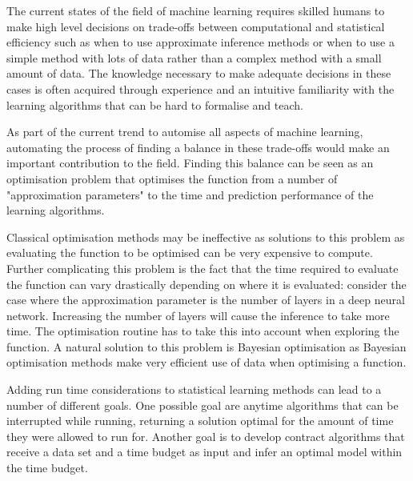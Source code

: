 \documentclass[a4paper,12pt,twoside,openright]{report}
\begin{document}
The current states of the field of machine learning requires skilled humans to make high level decisions on trade-offs between computational and statistical efficiency such as when to use approximate inference methods or when to use a simple method with lots of data rather than a complex method with a small amount of data. The knowledge necessary to make adequate decisions in these cases is often acquired through experience and an intuitive familiarity with the learning algorithms that can be hard to formalise and teach.

As part of the current trend to automise all aspects of machine learning, automating the process of finding a balance in these trade-offs would make an important contribution to the field. Finding this balance can be seen as an optimisation problem that optimises the function from a number of "approximation parameters" to the time and prediction performance of the learning algorithms. 

Classical optimisation methods may be ineffective as solutions to this problem as evaluating the function to be optimised can be very expensive to compute. Further complicating this problem is the fact that the time required to evaluate the function can vary drastically depending on where it is evaluated: consider the case where the approximation parameter is the number of layers in a deep neural network. Increasing the number of layers will cause the inference to take more time. The optimisation routine has to take this into account when exploring the function. A natural solution to this problem is Bayesian optimisation as Bayesian optimisation methods make very efficient use of data when optimising a function.

Adding run time considerations to statistical learning methods can lead to a number of different goals. One possible goal are anytime algorithms that can be interrupted while running, returning a solution optimal for the amount of time they were allowed to run for. Another goal is to develop contract algorithms that receive a data set and a time budget as input and infer an optimal model within the time budget.

\end{document}
